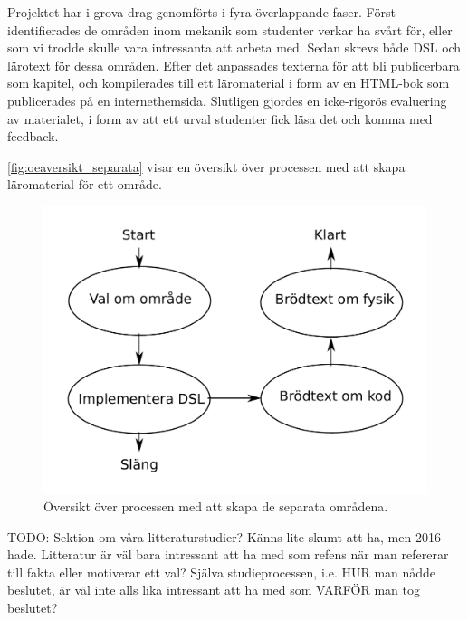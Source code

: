\begin{draft}

  Projektet har i grova drag genomförts i fyra överlappande
  faser. Först identifierades de områden inom mekanik som studenter
  verkar ha svårt för, eller som vi trodde skulle vara intressanta att
  arbeta med. Sedan skrevs både DSL och lärotext för dessa
  områden. Efter det anpassades texterna för att bli publicerbara som
  kapitel, och kompilerades till ett läromaterial i form av en
  HTML-bok som publicerades på en internethemsida. Slutligen gjordes
  en icke-rigorös evaluering av materialet, i form av att ett urval
  studenter fick läsa det och komma med feedback.

  \ref{fig:oeaversikt_separata} visar en översikt över processen med
  att skapa läromaterial för ett område.

  \begin{figure}
    \includegraphics[width=\linewidth]{figure/oeversikt_metod_process.pdf}
    \caption{Översikt över processen med att skapa de separata områdena.}
    \label{fig:oeversikt_separata}
  \end{figure}

\end{draft}

TODO: Sektion om våra litteraturstudier? Känns lite skumt att ha,
men 2016 hade. Litteratur är väl bara intressant att ha med som
refens när man refererar till fakta eller motiverar ett val? Själva
studieprocessen, i.e. HUR man nådde beslutet, är väl inte alls lika
intressant att ha med som VARFÖR man tog beslutet?

